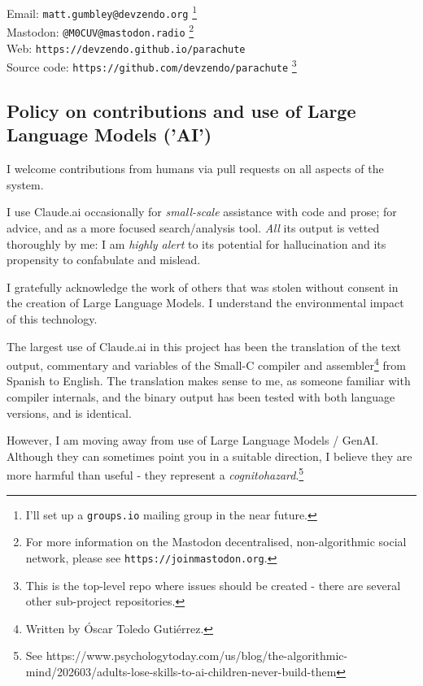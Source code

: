 \documentclass[a4paper]{tufte-book}
\begin{document}
Email: \verb|matt.gumbley@devzendo.org| \footnote{I'll set up a \texttt{groups.io} mailing group in the near future.} \\
\vspace{5mm}
Mastodon: \verb|@M0CUV@mastodon.radio| \footnote{For more information on the Mastodon decentralised, non-algorithmic social network, please see \texttt{https://joinmastodon.org}.} \\
\vspace{5mm}
Web: \verb|https://devzendo.github.io/parachute| \\
\vspace{5mm}
Source code: \verb|https://github.com/devzendo/parachute| \footnote{This is the top-level repo where issues should be created - there are several other sub-project repositories.}


\subsection{Policy on contributions and use of Large Language Models ('AI')}
I welcome contributions from humans via pull requests on all aspects of the system. 

\vspace{5mm}

I use Claude.ai occasionally for \textit{small-scale} assistance with code and prose; for advice, and as a more focused search/analysis tool. \textit{All} its output is vetted thoroughly by me: I am \textit{highly alert} to its potential for hallucination and its propensity to confabulate and mislead. 

\vspace{5mm}

I gratefully acknowledge the work of others that was stolen without consent in the creation of Large Language Models. I understand the environmental impact of this technology. 

\vspace{5mm}

The largest use of Claude.ai in this project has been the translation of the text output, commentary and variables of the Small-C compiler and assembler\footnote{Written by Óscar Toledo Gutiérrez.} from Spanish to English. The translation makes sense to me, as someone familiar with compiler internals, and the binary output has been tested with both language versions, and is identical. 

\vspace{5mm}

However, I am moving away from use of Large Language Models / GenAI. Although they can sometimes point you in a suitable direction, I believe they are more harmful than useful - they represent a \textit{cognitohazard}.\footnote{See https://www.psychologytoday.com/us/blog/the-algorithmic-mind/202603/adults-lose-skills-to-ai-children-never-build-them } 
\end{document}
